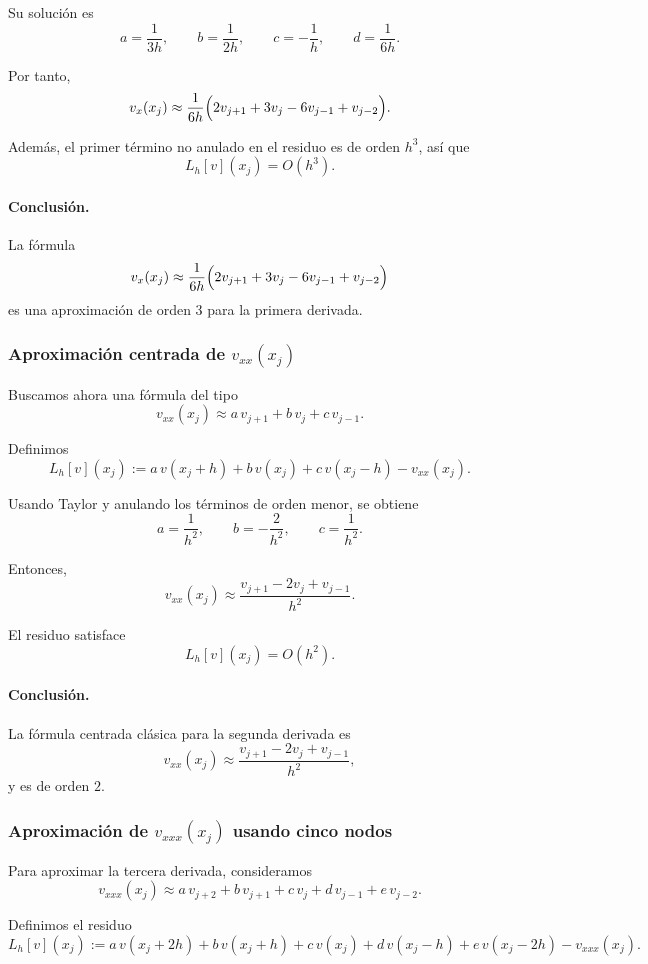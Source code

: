 Su solución es
\[
a=\frac{1}{3h},\qquad
b=\frac{1}{2h},\qquad
c=-\frac{1}{h},\qquad
d=\frac{1}{6h}.
\]

Por tanto,
\[
v_x(x_j)
\approx
\frac{1}{6h}\Bigl(2v_{j+1}+3v_j-6v_{j-1}+v_{j-2}\Bigr).
\]

Además, el primer término no anulado en el residuo es de orden \(h^3\), así que
\[
L_h[v](x_j)=O(h^3).
\]

\paragraph{Conclusión.}
La fórmula
\[
v_x(x_j)
\approx
\frac{1}{6h}\Bigl(2v_{j+1}+3v_j-6v_{j-1}+v_{j-2}\Bigr)
\]
es una aproximación de orden \(3\) para la primera derivada.

\subsubsection{Aproximación centrada de \texorpdfstring{$v_{xx}(x_j)$}{v_xx(x_j)}}

Buscamos ahora una fórmula del tipo
\[
v_{xx}(x_j)\approx a\,v_{j+1}+b\,v_j+c\,v_{j-1}.
\]

Definimos
\[
L_h[v](x_j):=
a\,v(x_j+h)+b\,v(x_j)+c\,v(x_j-h)-v_{xx}(x_j).
\]

Usando Taylor y anulando los términos de orden menor, se obtiene
\[
a=\frac{1}{h^2},\qquad
b=-\frac{2}{h^2},\qquad
c=\frac{1}{h^2}.
\]

Entonces,
\[
v_{xx}(x_j)
\approx
\frac{v_{j+1}-2v_j+v_{j-1}}{h^2}.
\]

El residuo satisface
\[
L_h[v](x_j)=O(h^2).
\]

\paragraph{Conclusión.}
La fórmula centrada clásica para la segunda derivada es
\[
v_{xx}(x_j)
\approx
\frac{v_{j+1}-2v_j+v_{j-1}}{h^2},
\]
y es de orden \(2\).

\subsubsection{Aproximación de \texorpdfstring{$v_{xxx}(x_j)$}{v_xxx(x_j)} usando cinco nodos}

Para aproximar la tercera derivada, consideramos
\[
v_{xxx}(x_j)\approx a\,v_{j+2}+b\,v_{j+1}+c\,v_j+d\,v_{j-1}+e\,v_{j-2}.
\]

Definimos el residuo
\[
L_h[v](x_j):=
a\,v(x_j+2h)+b\,v(x_j+h)+c\,v(x_j)+d\,v(x_j-h)+e\,v(x_j-2h)-v_{xxx}(x_j).
\]

